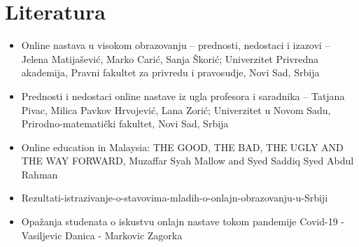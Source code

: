 \documentclass{article}
\begin{document}
\newpage

\section{Literatura}
\begin{itemize}
    \item Online nastava u visokom obrazovanju – prednosti, nedostaci i izazovi – Jelena Matijašević, Marko Carić, Sanja Škorić; Univerzitet Privredna akademija, Pravni fakultet za privredu i pravosudje, Novi Sad, Srbija
    \item Prednosti i nedostaci online nastave iz ugla profesora i saradnika – Tatjana Pivac, Milica Pavkov Hrvojević, Lana Zorić; Univerzitet u Novom Sadu, Prirodno-matematički fakultet, Novi Sad, Srbija
    \item Online education in Malaysia: THE GOOD, THE BAD, THE UGLY AND THE WAY FORWARD, Muzaffar Syah Mallow and Syed Saddiq Syed Abdul Rahman
    \item Rezultati-istrazivanje-o-stavovima-mladih-o-onlajn-obrazovanju-u-Srbiji
    \item Opažanja studenata o iskustvu onlajn nastave tokom pandemije Covid-19 - Vasiljevic Danica - Markovic Zagorka
\end{itemize}
\end{document}
